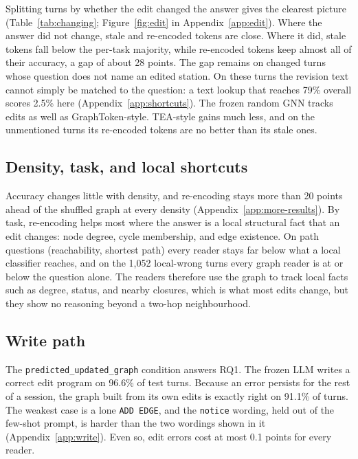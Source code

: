 \documentclass[11pt]{article}
\begin{document}
Splitting turns by whether the edit changed the answer gives the clearest picture (Table~\ref{tab:changing}; Figure~\ref{fig:edit} in Appendix~\ref{app:edit}).
Where the answer did not change, stale and re-encoded tokens are close.
Where it did, stale tokens fall below the per-task majority, while re-encoded tokens keep almost all of their accuracy, a gap of about 28 points.
The gap remains on changed turns whose question does not name an edited station.
On these turns the revision text cannot simply be matched to the question: a text lookup that reaches 79\% overall scores 2.5\% here (Appendix~\ref{app:shortcuts}).
The frozen random GNN tracks edits as well as GraphToken-style.
TEA-style gains much less, and on the unmentioned turns its re-encoded tokens are no better than its stale ones.

\subsection{Density, task, and local shortcuts}
\label{sec:breakdown}

Accuracy changes little with density, and re-encoding stays more than 20 points ahead of the shuffled graph at every density (Appendix~\ref{app:more-results}).
By task, re-encoding helps most where the answer is a local structural fact that an edit changes: node degree, cycle membership, and edge existence.
On path questions (reachability, shortest path) every reader stays far below what a local classifier reaches, and on the 1{,}052 local-wrong turns every graph reader is at or below the question alone.
The readers therefore use the graph to track local facts such as degree, status, and nearby closures, which is what most edits change, but they show no reasoning beyond a two-hop neighbourhood.

\subsection{Write path}
\label{sec:write}

The \texttt{predicted\_updated\_graph} condition answers RQ1.
The frozen LLM writes a correct edit program on 96.6\% of test turns.
Because an error persists for the rest of a session, the graph built from its own edits is exactly right on 91.1\% of turns.
The weakest case is a lone \texttt{ADD EDGE}, and the \texttt{notice} wording, held out of the few-shot prompt, is harder than the two wordings shown in it (Appendix~\ref{app:write}).
Even so, edit errors cost at most 0.1 points for every reader.
\end{document}

